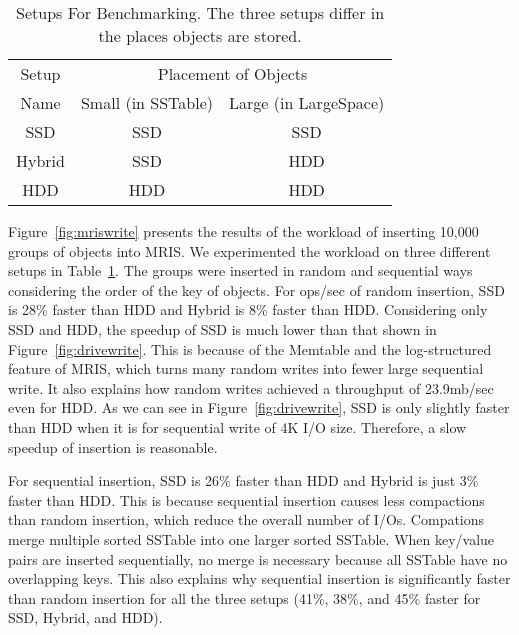 \begin{table}[tc]
{\centering \footnotesize
\begin{tabular}{c|c|c}
\hline 
  Setup & \multicolumn{2}{c}{Placement of Objects} \\ \cline{2-3}
   Name & Small (in SSTable) & Large (in LargeSpace) \\ \hline
  SSD & SSD & SSD \\
  Hybrid & SSD & HDD \\
  HDD & HDD & HDD \\ \hline 
\end{tabular}
 \caption{Setups For Benchmarking. The three setups differ in the
 places objects are stored.}
\label{tbl:setups}
}
\end{table}

Figure~\ref{fig:mriswrite} presents the results of the workload of
inserting 10,000 groups of objects into MRIS. We experimented the
workload on three different setups in Table~\ref{tbl:setups}. The
groups were inserted in random and sequential ways considering the
order of the key of objects. For ops/sec of random insertion, SSD is
28\% faster than HDD and Hybrid is 8\% faster than HDD. Considering
only SSD and HDD, the speedup of SSD is much lower than that shown in
Figure~\ref{fig:drivewrite}. This is because of the Memtable and the
log-structured feature of MRIS, which turns many random writes into
fewer large sequential write. It also explains how random writes
achieved a throughput of 23.9mb/sec even for HDD. As we can see in
Figure~\ref{fig:drivewrite}, SSD is only slightly faster than HDD
when it is for sequential write of 4K I/O size. Therefore, a slow
speedup of insertion is reasonable.

For sequential insertion, SSD is 26\% faster than HDD and Hybrid is
just 3\% faster than HDD. This is because sequential insertion causes
less compactions than random insertion, which reduce the overall
number of I/Os.  Compations merge multiple sorted SSTable into one
larger sorted SSTable. When key/value pairs are inserted sequentially,
no merge is necessary because all SSTable have no overlapping keys.
This also explains why sequential insertion is significantly faster
than random insertion for all the three setups (41\%, 38\%, and 45\%
faster for SSD, Hybrid, and HDD). 



